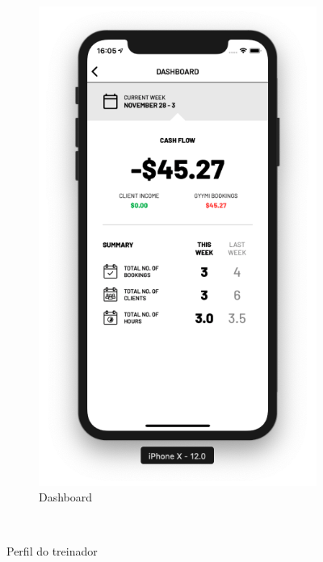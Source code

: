 \begin{figure}[H]
\begin{subfigure}[b]{0.4\textwidth}
        \includegraphics[width=\textwidth]{pfc/figuras/tr-dashboard.png}
        \caption{Dashboard}
        \label{fig:tr-dashboard}
    \end{subfigure}
    ~
    \caption{Perfil do treinador}
    \label{fig:tr-profile}
\end{figure}
